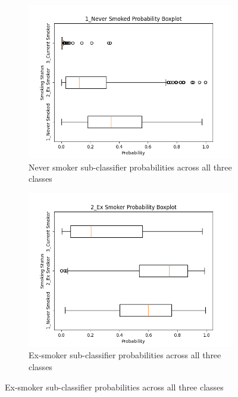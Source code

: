 \documentclass{article}
\begin{document}
\begin{figure}
    \centering
    \begin{subfigure}{0.48\textwidth}
        \centering
        \includegraphics[width=\linewidth]{cohort2_1_boxplot.png}
        \caption{Never smoker sub-classifier probabilities across all three classes}
    \end{subfigure}
    \hfill
    \begin{subfigure}{0.48\textwidth}
        \centering
        \includegraphics[width=\linewidth]{cohort2_2_boxplot.png}
        \caption{Ex-smoker sub-classifier probabilities across all three classes}
    \end{subfigure}
    \par\vspace{0.5em}

\end{figure}
\end{document}
